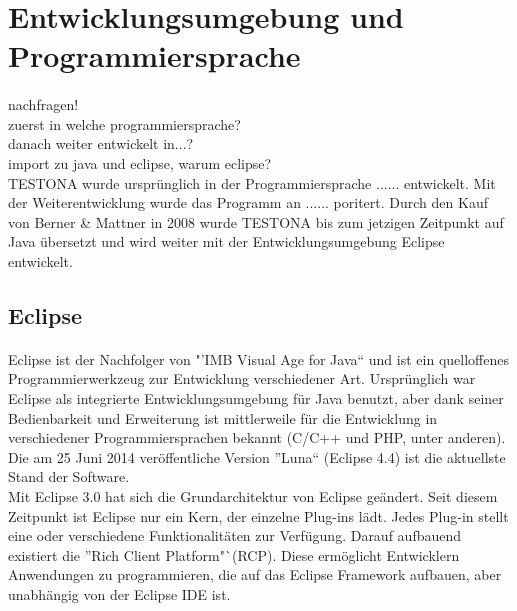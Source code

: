 \paragraph{}


\section{Entwicklungsumgebung und Programmiersprache}
\paragraph{}

nachfragen!\\
zuerst in welche programmiersprache?\\
danach weiter entwickelt in...?\\
import zu java und eclipse, warum eclipse?\\

TESTONA wurde ursprünglich in der Programmiersprache ...... entwickelt. Mit der Weiterentwicklung wurde das Programm an ...... poritert. Durch den Kauf von Berner \& Mattner in 2008 wurde TESTONA bis zum jetzigen Zeitpunkt auf Java übersetzt und wird weiter mit der Entwicklungsumgebung Eclipse entwickelt.

\subsection{Eclipse}
\paragraph{}
Eclipse ist der Nachfolger von "'IMB Visual Age for Java"` und ist ein quelloffenes Programmierwerkzeug zur Entwicklung verschiedener Art. Ursprünglich war Eclipse als integrierte Entwicklungsumgebung für Java benutzt, aber dank seiner Bedienbarkeit und Erweiterung ist mittlerweile für die Entwicklung in verschiedener Programmiersprachen bekannt (C/C++ und PHP, unter anderen). Die am 25 Juni 2014 veröffentliche Version "'Luna"` (Eclipse 4.4) ist die aktuellste Stand der Software. \\

Mit Eclipse 3.0 hat sich die Grundarchitektur von Eclipse geändert. Seit diesem Zeitpunkt ist Eclipse nur ein Kern, der einzelne Plug-ins lädt. Jedes Plug-in stellt eine oder verschiedene Funktionalitäten zur Verfügung. Darauf aufbauend existiert die "'Rich Client Platform"`(RCP). Diese ermöglicht Entwicklern Anwendungen zu programmieren, die auf das Eclipse Framework aufbauen, aber unabhängig von der Eclipse IDE ist.\cite{EclipseRCP} \cite{Eclipse}\\



